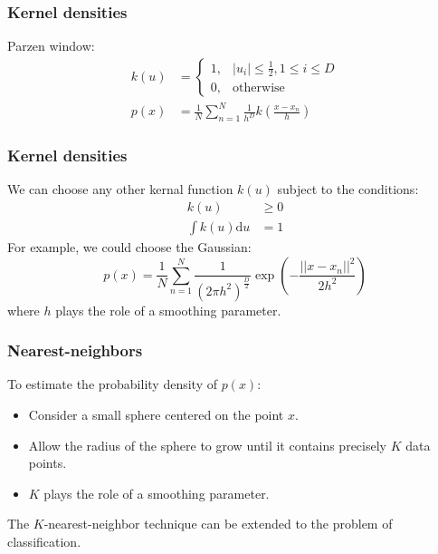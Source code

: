 \documentclass{beamer}
\begin{document}
\begin{frame}
    \frametitle{Kernel densities}
    Parzen window:
    \begin{align*}
        k(u)&=
        \begin{cases}
            1,&|u_{i}|\le\frac{1}{2},1\le{}i\le{}D \\
            0,&\mathrm{otherwise}
        \end{cases} \\
        p(x)&=\frac{1}{N}\sum_{n=1}^{N}\frac{1}{h^{D}}k(\frac{x-x_{n}}{h})
    \end{align*}
\end{frame}

\begin{frame}
    \frametitle{Kernel densities}
    We can choose any other kernal function $k(u)$ subject to the conditions:
    \begin{align*}
        k(u)&\ge{}0 \\
        \int{}k(u)\mathrm{d}u&=1
    \end{align*}
    For example, we could choose the Gaussian:
    \begin{equation*}
        p(x)=\frac{1}{N}\sum_{n=1}^{N}\frac{1}{(2\pi{}h^{2})^{\frac{D}{2}}}\exp(-\frac{||x-x_{n}||^{2}}{2h^{2}})
    \end{equation*}
    where $h$ plays the role of a smoothing parameter.
\end{frame}

\begin{frame}
    \frametitle{Nearest-neighbors}
    To estimate the probability density of $p(x)$:
    \begin{itemize}
        \item Consider a small sphere centered on the point $x$.
        \item Allow the radius of the sphere to grow until it contains precisely $K$ data points.
        \item $K$ plays the role of a smoothing parameter.
    \end{itemize}
    The $K$-nearest-neighbor technique can be extended to the problem of classification.
\end{frame}
\end{document}
